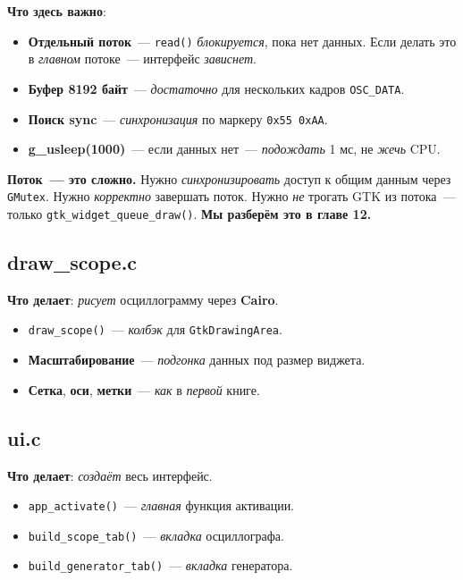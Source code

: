 \textbf{Что здесь важно}:

\begin{itemize}
    \item \textbf{Отдельный поток}~--- \texttt{read()}
          \emph{блокируется}, пока нет данных. Если
          делать это в \emph{главном} потоке~---
          интерфейс \emph{зависнет}.
    \item \textbf{Буфер 8192 байт}~--- \emph{достаточно}
          для нескольких кадров \texttt{OSC\_DATA}.
    \item \textbf{Поиск sync}~--- \emph{синхронизация}
          по маркеру \texttt{0x55 0xAA}.
    \item \textbf{g\_usleep(1000)}~--- если данных
          нет~--- \emph{подождать} 1 мс, не \emph{жечь}
          CPU.
\end{itemize}

\begin{warnbox}
\textbf{Поток~--- это сложно.} Нужно \emph{синхронизировать}
доступ к общим данным через \texttt{GMutex}. Нужно
\emph{корректно} завершать поток. Нужно \emph{не} трогать
GTK из потока~--- только \texttt{gtk\_widget\_queue\_draw()}.
\textbf{Мы разберём это в главе 12.}
\end{warnbox}

\subsection{draw\_scope.c}

\textbf{Что делает}: \emph{рисует} осциллограмму через
\textbf{Cairo}.

\begin{itemize}
    \item \texttt{draw\_scope()}~--- \emph{колбэк}
          для \texttt{GtkDrawingArea}.
    \item \textbf{Масштабирование}~--- \emph{подгонка}
          данных под размер виджета.
    \item \textbf{Сетка}, \textbf{оси}, \textbf{метки}~---
          \emph{как} в \emph{первой} книге.
\end{itemize}

\subsection{ui.c}

\textbf{Что делает}: \emph{создаёт} весь интерфейс.

\begin{itemize}
    \item \texttt{app\_activate()}~--- \emph{главная}
          функция активации.
    \item \texttt{build\_scope\_tab()}~--- \emph{вкладка}
          осциллографа.
    \item \texttt{build\_generator\_tab()}~--- \emph{вкладка}
          генератора.
\end{itemize}

